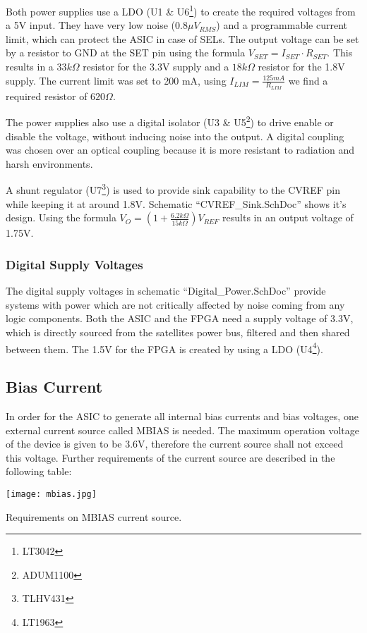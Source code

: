 Both power supplies use a LDO (U1 \& U6\footnote{LT3042}) to create the required voltages from a 5V input.
They have very low noise ($0.8 \mu V_{RMS}$) and a programmable current limit, which can protect the ASIC in case of SELs.
The output voltage can be set by a resistor to GND at the SET pin using the formula $V_{SET} = I_{SET}\cdot R_{SET}$.
This results in a $33k\Omega$ resistor for the 3.3V supply and a $18k\Omega$ resistor for the 1.8V supply.
The current limit was set to 200 mA, using $I_{LIM} = \frac{125mA}{R_{LIM}}$ we find a required resistor of $620\Omega$.

The power supplies also use a digital isolator (U3 \& U5\footnote{ADUM1100}) to drive enable or disable the voltage, without inducing noise into the output.
A digital coupling was chosen over an optical coupling because it is more resistant to radiation and harsh environments.

A shunt regulator (U7\footnote{TLHV431}) is used to provide sink capability to the CVREF pin while keeping it at around 1.8V.
Schematic ``CVREF\_Sink.SchDoc'' shows it's design.
Using the formula $V_O = (1+\frac{6.2k\Omega}{15k\Omega})V_{REF}$ results in an output voltage of 1.75V.

\subsubsection{Digital Supply Voltages}
\label{sec:digital_supply}
The digital supply voltages in schematic ``Digital\_Power.SchDoc'' provide systems with power which are not critically affected by noise coming from any logic components.
Both the ASIC and the FPGA need a supply voltage of 3.3V, which is directly sourced from the satellites power bus, filtered and then shared between them.
The 1.5V for the FPGA is created by using a LDO (U4\footnote{LT1963}).


\subsection{Bias Current}
\label{sec:bias_current}
In order for the ASIC to generate all internal bias currents and bias voltages, one external current source called MBIAS is needed.
The maximum operation voltage of the device is given to be 3.6V, therefore the current source shall not exceed this voltage.
Further requirements of the current source are described in the following table:\cite[p. 64-65]{Meier2016VATA466}
\begin{table}[H]
	\centering
    \texttt{[image: mbias.jpg]}
    \caption[MBIAS Parameters]{Requirements on MBIAS current source.\cite[p. 65, tab. 30]{Meier2016VATA466}}
	\label{tab:mbias}
\end{table}

